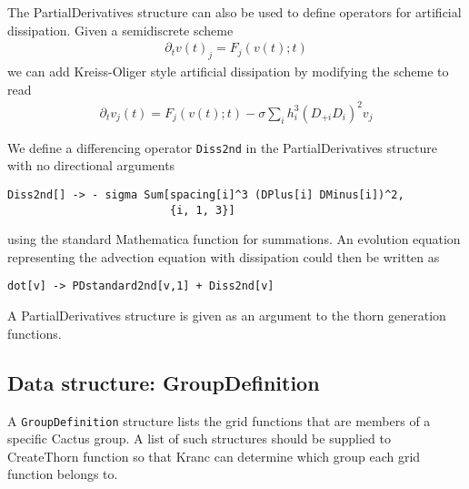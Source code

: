 \documentclass{report}
\begin{document}
The PartialDerivatives structure can also be used to define operators
for artificial dissipation.  Given a semidiscrete scheme
\begin{eqnarray}
\partial_t v(t)_j = F_j(v(t);t)
\end{eqnarray}
we can add Kreiss-Oliger style artificial dissipation by modifying the
scheme to read
\begin{eqnarray}
\partial_t v_j(t) = F_j(v(t);t) - \sigma \sum_i h_i^3 (D_{+i} D_{i})^2 v_j
\end{eqnarray}

We define a differencing operator {\tt Diss2nd} in the
PartialDerivatives structure with no directional arguments

\begin{center}
\begin{minipage}{0.8 \textwidth}
\begin{verbatim}
Diss2nd[] -> - sigma Sum[spacing[i]^3 (DPlus[i] DMinus[i])^2, 
                         {i, 1, 3}]
\end{verbatim}
\end{minipage}
\end{center}

using the standard Mathematica function for summations.  An evolution
equation representing the advection equation with dissipation could
then be written as

\begin{center}
\begin{minipage}{0.8 \textwidth}
\begin{verbatim}
dot[v] -> PDstandard2nd[v,1] + Diss2nd[v]
\end{verbatim}
\end{minipage}
\end{center}

A PartialDerivatives structure is given as an argument to the thorn
generation functions.

\subsection{Data structure: GroupDefinition}

A {\tt GroupDefinition} structure lists the grid functions that are
members of a specific Cactus group.  A list of such structures should
be supplied to CreateThorn function so that Kranc can determine which
group each grid function belongs to.
\end{document}
